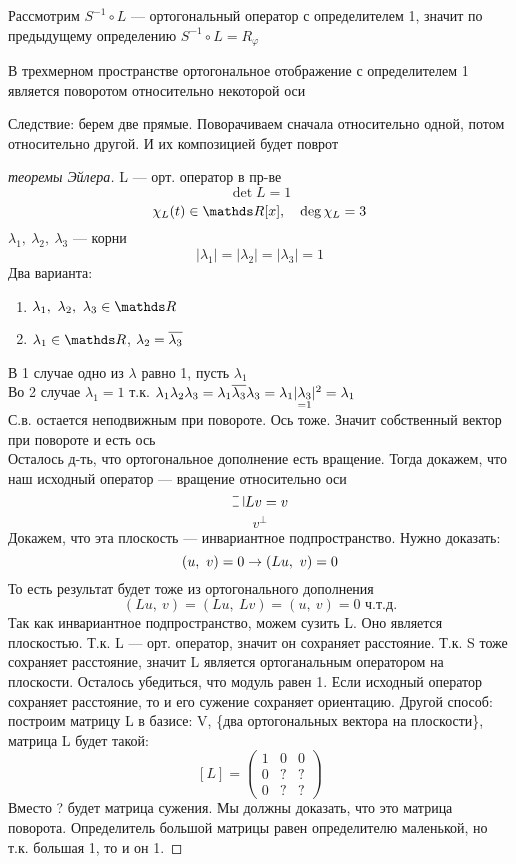 \documentclass[main]{subfiles}
\begin{document}
    Рассмотрим $S^{-1} \circ L$ --- ортогональный оператор с определителем 1, значит по предыдущему определению $S^{-1} \circ L = R_{\varphi}$

    \begin{utv}
        В трехмерном пространстве ортогональное отображение с определителем 1 является поворотом относительно некоторой оси
    \end{utv}

    Следствие: берем две прямые. Поворачиваем сначала относительно одной, потом относительно другой. И их композицией будет поврот

    \begin{proof}[теоремы Эйлера]
        L --- орт. оператор в пр-ве
        \[\det L = 1\]
        \[\chi_L(t) \in \R[x],\q \deg \chi_L = 3\]
        $\lambda_1,\ \lambda_2,\ \lambda_3$ --- корни
        \[|\lambda_1| = |\lambda_2| = |\lambda_3| = 1\]
        Два варианта:
        \begin{enumerate}
            \item $\lambda_1,\ \lambda_2,\ \lambda_3 \in \R$
            \item $\lambda_1 \in \R$, $\lambda_2 = \overline{\lambda_3}$
        \end{enumerate}
        В 1 случае одно из $\lambda$ равно 1, пусть $\lambda_1$\\
        Во 2 случае $\lambda_1 = 1$ т.к. $\lambda_1 \lambda_2 \lambda_3 = \lambda_1 \overline{\lambda_3} \lambda_3 = \lambda_1 |\underset{=1}{\lambda_3}|^2 = \lambda_1$\\
        С.в. остается неподвижным при повороте. Ось тоже. Значит собственный вектор  при повороте и есть ось\\
        Осталось д-ть, что ортогональное дополнение есть вращение. Тогда докажем, что наш исходный оператор --- вращение относительно оси
        \[\letus Lv = v\]
        \[v^{\bot}\]
        Докажем, что эта плоскость --- инвариантное подпространство. Нужно доказать:
        \[(u,\ v) = 0 \rightarrow (Lu,\ v) = 0\]
        То есть результат будет тоже из ортогонального дополнения
        \[(Lu,\ v) = (Lu,\ Lv) = (u,\ v) = 0 \text{ ч.т.д.}\]
        Так как инвариантное подпространство, можем сузить L. Оно является плоскостью. Т.к. L --- орт. оператор, значит он сохраняет расстояние. Т.к. S тоже сохраняет расстояние, значит L является ортоганальным оператором на плоскости. Осталось убедиться, что модуль равен 1. Если исходный оператор сохраняет расстояние, то и его сужение сохраняет ориентацию. Другой способ: построим матрицу L в базисе: V, \{два ортогональных вектора на плоскости\}, матрица L будет такой:\\
        \[[L] = \begin{pmatrix}
            1 & 0 & 0\\
            0 & ? & ?\\
            0 & ? & ?
        \end{pmatrix}\]
        Вместо ? будет матрица сужения. Мы должны доказать, что это матрица поворота. Определитель большой матрицы равен определителю маленькой, но т.к. большая 1, то и он 1.


\end{proof}
\end{document}
